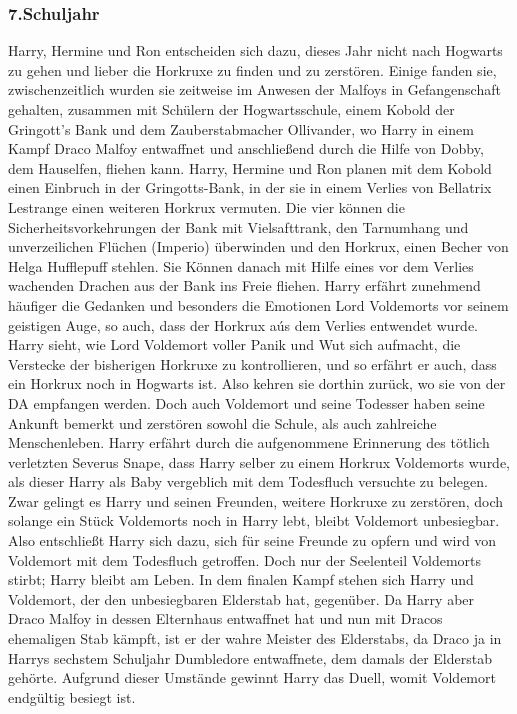 \documentclass[a4paper, 10pt]{article}
\begin{document}
\subsubsection*{\large 7.Schuljahr}
Harry, Hermine und Ron entscheiden sich dazu, dieses Jahr nicht nach Hogwarts zu gehen und lieber die Horkruxe zu finden und zu zerstören. Einige fanden sie, zwischenzeitlich wurden sie zeitweise im Anwesen der Malfoys in Gefangenschaft gehalten, zusammen mit Schülern der Hogwartsschule, einem Kobold der Gringott's Bank und dem Zauberstabmacher Ollivander, wo Harry in einem Kampf Draco Malfoy entwaffnet und anschließend durch die Hilfe von Dobby, dem Hauselfen, fliehen kann.
\vspace{10pt}
\newline
{}  
Harry, Hermine und Ron planen mit dem Kobold einen Einbruch in der Gringotts-Bank, in der sie in einem Verlies von Bellatrix Lestrange einen weiteren Horkrux vermuten. Die vier können die Sicherheitsvorkehrungen der Bank mit Vielsafttrank, den Tarnumhang und unverzeilichen Flüchen (Imperio) überwinden und den Horkrux, einen Becher von Helga Hufflepuff stehlen. Sie Können danach mit Hilfe eines vor dem Verlies wachenden Drachen aus der Bank ins Freie fliehen.
\vspace{10pt}
\newline
{}  
Harry erfährt zunehmend häufiger die Gedanken und besonders die Emotionen Lord Voldemorts vor seinem geistigen Auge, so auch, dass der Horkrux aús dem Verlies entwendet wurde. Harry sieht, wie Lord Voldemort voller Panik und Wut sich aufmacht, die Verstecke der bisherigen Horkruxe zu kontrollieren, und so erfährt er auch, dass ein Horkrux noch in Hogwarts ist. Also kehren sie dorthin zurück, wo sie von der DA empfangen werden. Doch auch Voldemort und seine Todesser haben seine Ankunft bemerkt und zerstören sowohl die Schule, als auch zahlreiche Menschenleben.
\vspace{10pt}
\newline
{}  
Harry erfährt durch die aufgenommene Erinnerung des tötlich verletzten Severus Snape, dass Harry selber zu einem Horkrux Voldemorts wurde, als dieser Harry als Baby vergeblich mit dem Todesfluch versuchte zu belegen. Zwar gelingt es Harry und seinen Freunden, weitere Horkruxe zu zerstören, doch solange ein Stück Voldemorts noch in Harry lebt, bleibt Voldemort unbesiegbar. Also entschließt Harry sich dazu, sich für seine Freunde zu opfern und wird von Voldemort mit dem Todesfluch getroffen. Doch nur der Seelenteil Voldemorts stirbt; Harry bleibt am Leben.
\vspace{10pt}
\newline
{}  
In dem finalen Kampf stehen sich Harry und Voldemort, der den unbesiegbaren Elderstab hat, gegenüber. Da Harry aber Draco Malfoy in dessen Elternhaus entwaffnet hat und nun mit Dracos ehemaligen Stab kämpft, ist er der wahre Meister des Elderstabs, da Draco ja in Harrys sechstem Schuljahr Dumbledore entwaffnete, dem damals der Elderstab gehörte. Aufgrund dieser Umstände gewinnt Harry das Duell, womit Voldemort endgültig besiegt ist.
\end{document}
